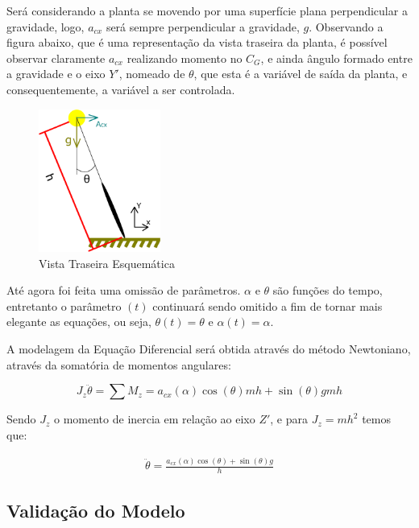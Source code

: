 \documentclass[conference,harvard,brazil,english]{sbatex}
\begin{document}
            Será considerando a planta se movendo por uma superfície plana perpendicular a gravidade, logo, $a_{cx}$ será sempre perpendicular a gravidade, $g$.
            Observando a figura abaixo, que é uma representação da vista traseira da planta, é possível observar claramente  $a_{cx}$ realizando momento no $C_G$, e ainda ângulo formado entre a gravidade e o eixo $Y'$, nomeado de $\theta$, que esta é a variável de saída da planta, e consequentemente, a variável a ser controlada.
            
            \begin{figure}[h]
                \centering
                \includegraphics[width=4cm]{imagens/geometria/VistaTraseira.eps}
                \caption{Vista Traseira Esquemática}
            \end{figure}
            
            Até agora foi feita uma omissão de parâmetros. $\alpha$ e $\theta$ são funções do tempo, entretanto o parâmetro $(t)$ continuará sendo omitido a fim de tornar mais elegante as equações, ou seja, $\theta(t) = \theta$ e $\alpha(t) = \alpha$.

            A modelagem da Equação Diferencial será obtida através do método Newtoniano, através da somatória de momentos angulares:
            
            \begin{equation}
                J_z \ddot\theta = \sum M_z  = a_{cx}(\alpha) \cos(\theta)mh + \sin(\theta)gmh
            \end{equation}
            
            Sendo $J_z$ o momento de inercia em relação ao eixo $Z'$, e para $J_z=mh^2$ temos que:
            
            \begin{eqnarray}
                \ddot \theta =  \frac{a_{cx} (\alpha) \cos (\theta)  + \sin (\theta) g}{h}
            \end{eqnarray}
        
        \subsection{Validação do Modelo}
        
\end{document}
